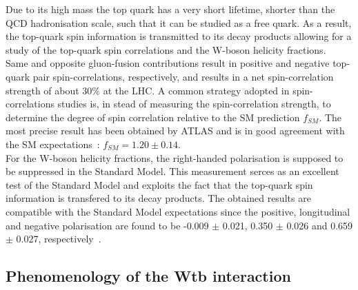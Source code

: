 Due to its high mass the top quark has a very short lifetime, shorter than the QCD hadronisation scale, such that it can be studied as a free quark. As a result, the top-quark spin information is transmitted to its decay products allowing for a study of the top-quark spin correlations and the W-boson helicity fractions.
\\
Same and opposite gluon-fusion contributions result in positive and negative top-quark pair spin-correlations, respectively, and results in a net spin-correlation strength of about $30 \%$ at the LHC.
A common strategy adopted in spin-correlations studies is, in stead of measuring the spin-correlation strength, to determine the degree of spin correlation relative to the SM prediction $f_{SM}$. 
The most precise result has been obtained by ATLAS and is in good agreement with the SM expectations~\cite{AtlasSpinCorr}: $f_{SM} = 1.20 \pm 0.14$.
\\
For the W-boson helicity fractions, the right-handed polarisation is supposed to be suppressed in the Standard Model.
This measurement serces as an excellent test of the Standard Model and exploits the fact that the top-quark spin information is transfered to its decay products.
The obtained results are compatible with the Standard Model expectations since the positive, longitudinal and negative polarisation are found to be -0.009 $\pm$ 0.021, 0.350 $\pm$ 0.026 and 0.659 $\pm$ 0.027, respectively~\cite{CMSWHelicity}.

\subsection{Phenomenology of the Wtb interaction}


